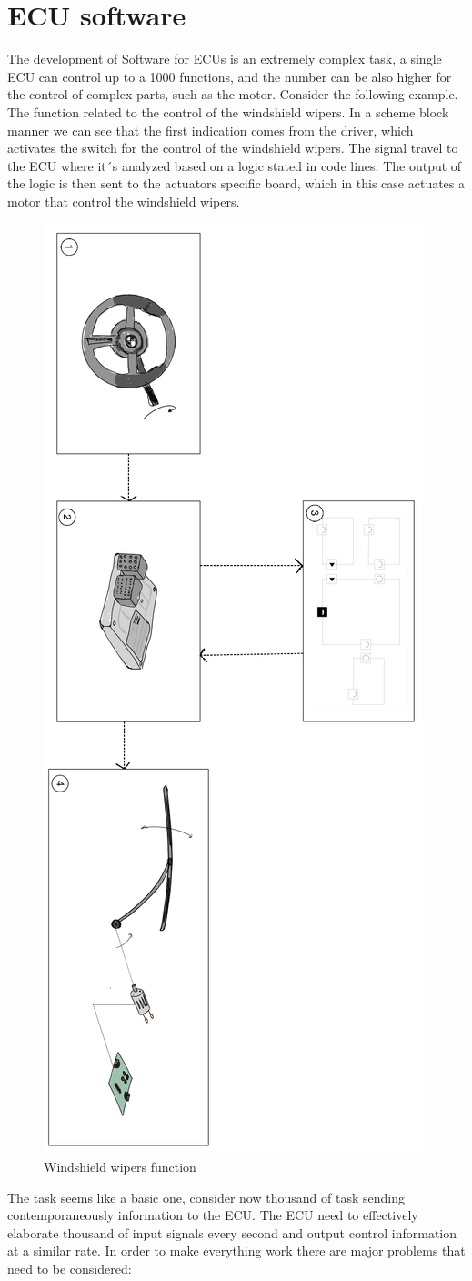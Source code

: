 \documentclass[../main.tex]{subfiles}
\begin{document}
\section{\gls{ECU} software}
The development of Software for \gls{ECU}s is an extremely complex task, a single \gls{ECU} can control up to a 1000 functions, and the number can be also higher for the control of complex parts, such as the motor.
Consider the following example. The function related to the control of the windshield wipers. In a scheme block manner we can see that the first indication comes from the driver, which activates the switch for the control of the windshield wipers. The signal travel to the \gls{ECU} where it´s analyzed based on a logic stated in code lines. The output of the logic is then sent to the actuators specific board, which in this case actuates a motor that control the windshield wipers.\\
\begin{figure}[H]
    \centering
    \includegraphics[width=0.45\linewidth, angle = 90]{images_folder/windshieldwipersfunction.jpeg}
    \caption{Windshield wipers function}
    \label{fig:WWFunct}
\end{figure}
The task seems like a basic one, consider now thousand of task sending contemporaneously information to the \gls{ECU}. The \gls{ECU} need to effectively elaborate thousand of input signals every second and output control information at a similar rate. In order to make everything work there are major problems that need to be considered:
\end{document}
